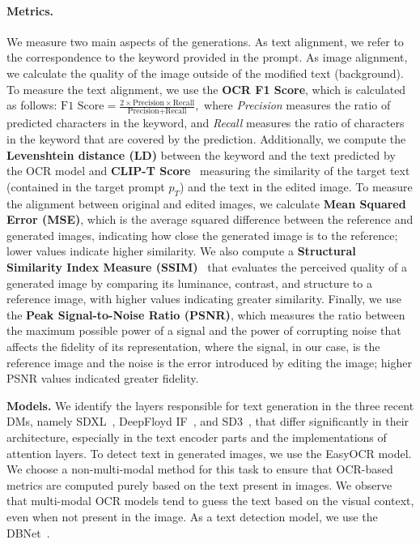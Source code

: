 \paragraph{Metrics.} We measure two main aspects of the generations. As text alignment, we refer to the correspondence to the keyword provided in the prompt. As image alignment, we calculate the quality of the image outside of the modified text (\eg background).
To measure the text alignment, we use the \textbf{OCR F1 Score}, which is calculated as follows:
$
    \text{F1 Score} = \frac{2 \times \text{Precision} \times \text{Recall}}{\text{Precision} + \text{Recall}},
$
where \textit{Precision} measures the ratio of predicted characters in the keyword, and \textit{Recall} measures the ratio of characters in the keyword that are covered by the prediction.
Additionally, we compute the \textbf{Levenshtein distance (LD)} between the keyword and the text predicted by the OCR model and
\textbf{CLIP-T Score}~\cite{clip} measuring the similarity of the target text (contained in the target prompt $p_{T}$) and the text in the edited image.
To measure the alignment between original and edited images, we calculate \textbf{Mean Squared Error (MSE)}, which is the average squared difference between the reference and generated images, indicating how close the generated image is to the reference; lower values indicate higher similarity. We also compute a \textbf{Structural Similarity Index Measure (SSIM)}~\cite{wang2004image} that evaluates the perceived quality of a generated image by comparing its luminance, contrast, and structure to a reference image, with higher values indicating greater similarity. Finally, we use the \textbf{Peak Signal-to-Noise Ratio (PSNR)}, which measures the ratio between the maximum possible power of a signal and the power of corrupting noise that affects the fidelity of its representation, where the signal, in our case, is the reference image and the noise is the error introduced by editing the image; higher PSNR values indicated greater fidelity.

\textbf{Models.} We identify the layers responsible for text generation in the three recent DMs, namely SDXL~\citep{podell2023sdxl}, DeepFloyd IF~\citep{DeepFloydIF}, and SD3~\citep{esser2024scalingSD3}, that differ significantly in their architecture, especially in the text encoder parts and the implementations of attention layers.
To detect text in generated images, we use the EasyOCR model. We choose a non-multi-modal method for this task to ensure that OCR-based metrics are computed purely based on the text present in images. We observe that multi-modal OCR models tend to guess the text based on the visual context, even when not present in the image.
As a text detection model, we use the DBNet~\citep{Liao_Wan_Yao_Chen_Bai_2020}.
